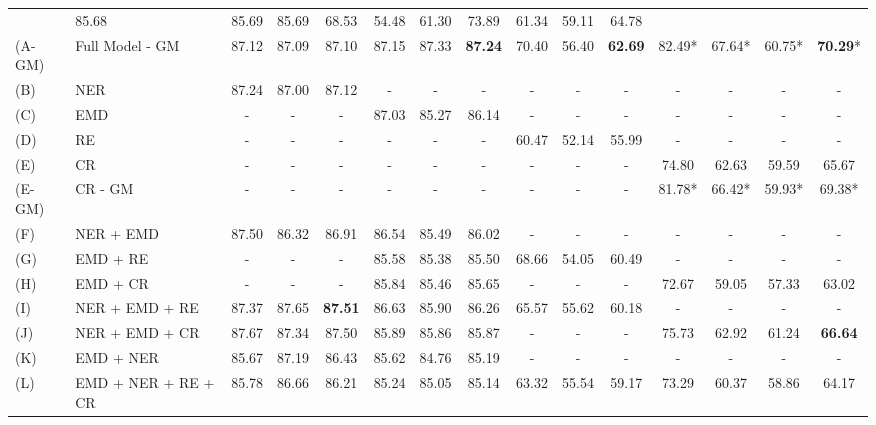 \documentclass[letterpaper]{article} %
\begin{document}
\begin{table}
{\begin{tabular}{|l l|| c|c|c || c|c|c || c|c|c || c|c|c|c |}
                & 85.68 & 85.69 & 85.69
                & 68.53 & 54.48 & 61.30
                & 73.89 & 61.34 & 59.11 & 64.78 \\
        (A-GM) & Full Model - GM
                & 87.12 & 87.09 & 87.10 
                & 87.15 & 87.33 & \textbf{87.24}
                & 70.40 & 56.40 & \textbf{62.69}
                & 82.49* & 67.64* & 60.75* & \textbf{70.29}* \\
       \hline
       (B) & NER 
            & 87.24 & 87.00 & 87.12
            & - & - & -
            & - & - & -
            & - & - & - & - \\
        (C) & EMD 
            & - & - & - 
            & 87.03 & 85.27 & 86.14
            & - & - & -
            & - & - & - & - \\
        (D) & RE 
            & - & - & - 
            & - & - & -
            & 60.47 & 52.14 & 55.99
            & - & - & - & - \\
        (E) & CR 
            & - & - & - 
            & - & - & -
            & - & - & -
            & 74.80 & 62.63 & 59.59 & 65.67 \\
        (E-GM) & CR - GM 
            & - & - & - 
            & - & - & -
            & - & - & -
            & 81.78* & 66.42* & 59.93* & 69.38* \\
        \hline
        (F) & NER + EMD 
            & 87.50 & 86.32 & 86.91
            & 86.54 & 85.49 & 86.02
            & - & - & -
            & - & - & - & - \\
        (G) & EMD + RE 
            & - & - & -
            & 85.58 & 85.38 & 85.50
            & 68.66 & 54.05 & 60.49
            & - & - & - & - \\
        (H) & EMD + CR 
            & - & - & -
            & 85.84 & 85.46 & 85.65
            & - & - & -
            & 72.67 & 59.05 & 57.33 & 63.02 \\
        \hline
        (I) & NER + EMD + RE 
            & 87.37 & 87.65 & \textbf{87.51} 
            & 86.63 & 85.90 & 86.26
            & 65.57 & 55.62 & 60.18
            & - & - & - & - \\
        (J) & NER + EMD + CR 
            & 87.67 & 87.34 & 87.50 
            & 85.89 & 85.86 & 85.87
            & - & - & -
            & 75.73 & 62.92 & 61.24 & \textbf{66.64} \\
        \hline
        (K) & EMD + NER 
            & 85.67 & 87.19 & 86.43 
            & 85.62 & 84.76 & 85.19 
            & - & - & -
            & - & - & - & - \\
        (L) & EMD + NER + RE + CR 
            & 85.78 & 86.66 & 86.21 
            & 85.24 & 85.05 & 85.14 
            & 63.32 & 55.54 & 59.17 
            & 73.29 & 60.37 & 58.86 & 64.17 \\
        \hline
    \end{tabular}%
}
\end{table}
\end{document}
